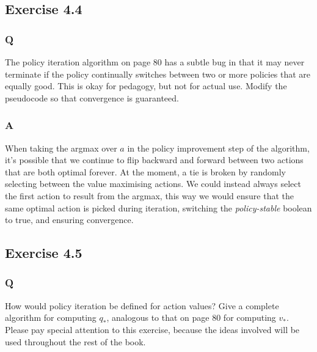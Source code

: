 \subsection*{Exercise 4.4}
\subsubsection{Q}
The policy iteration algorithm on page 80 has a subtle bug in that it may never terminate if the policy continually switches between two or more policies that are equally good. This is okay for pedagogy, but not for actual use. Modify the pseudocode so that convergence is guaranteed.
\subsubsection{A}
When taking the argmax over $a$ in the policy improvement step of the algorithm, it's possible that we continue to flip backward and forward between two actions that are both optimal forever. At the moment, a tie is broken by randomly selecting between the value maximising actions. We could instead always select the first action to result from the argmax, this way we would ensure that the same optimal action is picked during iteration, switching the \textit{policy-stable} boolean to true, and ensuring convergence.

\subsection*{Exercise 4.5}
\subsubsection{Q}
How would policy iteration be defined for action values? Give a complete algorithm for computing $q_*$, analogous to that on page 80 for computing $v_*$. Please pay special attention to this exercise, because the ideas involved will be used throughout the rest of the book.
